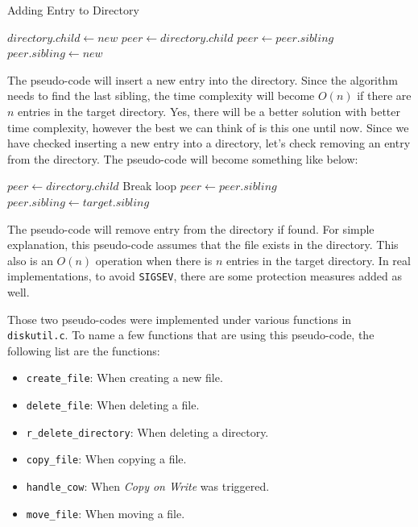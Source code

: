 \documentclass{homework}
\begin{document}
\begin{algorithm}
\caption{Adding Entry to Directory}\label{alg:cap}
\begin{algorithmic}
     
        \State $directory.child \gets new$
    \Else
        \State $peer \gets directory.child$
         
            \State $peer \gets peer.sibling$
        \EndWhile
        \State $peer.sibling \gets new$ 
    \EndIf
\end{algorithmic}
\end{algorithm}
The pseudo-code will insert a new entry into the directory. Since the algorithm needs to find the last sibling, the time complexity will become $O(n)$ if there are $n$ entries in the target directory. Yes, there will be a better solution with better time complexity, however the best we can think of is this one until now. Since we have checked inserting a new entry into a directory, let's check removing an entry from the directory. The pseudo-code will become something like below:

\begin{algorithm}
\begin{algorithmic}
        \State $peer \gets directory.child$
         
                \State Break loop
            \EndIf
            \State $peer \gets peer.sibling$
        \EndWhile
        \State $peer.sibling \gets target.sibling$ 
\end{algorithmic}
\end{algorithm}

The pseudo-code will remove entry from the directory if found. For simple explanation, this pseudo-code assumes that the file exists in the directory. This also is an $O(n)$ operation when there is $n$ entries in the target directory. In real implementations, to avoid \texttt{SIGSEV}, there are some protection measures added as well.

Those two pseudo-codes were implemented under various functions in \texttt{diskutil.c}. To name a few functions that are using this pseudo-code, the following list are the functions:
\begin{itemize}
    \item \texttt{create_file}:  When creating a new file.
    \item \texttt{delete_file}: When deleting a file.
    \item \texttt{r_delete_directory}: When deleting a directory.
    \item \texttt{copy_file}: When copying a file.
    \item \texttt{handle_cow}: When \textit{Copy on Write} was triggered.
    \item \texttt{move_file}: When moving a file.
\end{itemize}
\pagebreak
\end{document}
